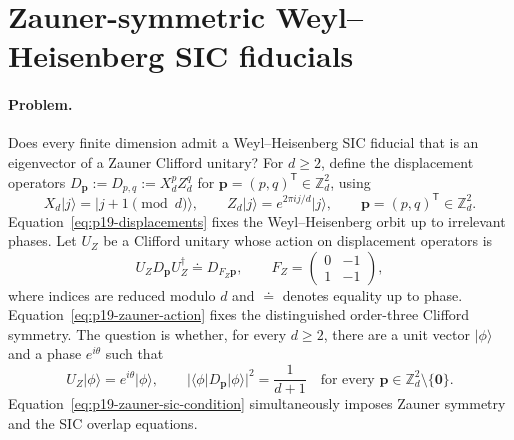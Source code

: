 \section{Zauner-symmetric Weyl--Heisenberg SIC fiducials}
\label{sec:op_ff2e80b425aebb86}

\paragraph{Problem.}
Does every finite dimension admit a Weyl--Heisenberg SIC fiducial that is an
eigenvector of a Zauner Clifford unitary?  For $d\geq2$, define the displacement
operators $D_{\mathbf p}:=D_{p,q}:=X_d^pZ_d^q$ for
$\mathbf p=(p,q)^{\mathsf T}\in\mathbb Z_d^2$, using
\begin{equation}
  X_d\lvert j\rangle=\lvert j+1\!\!\pmod d\rangle,
  \qquad
  Z_d\lvert j\rangle=e^{2\pi i j/d}\lvert j\rangle,
  \qquad \mathbf p=(p,q)^{\mathsf T}\in\mathbb Z_d^2.
  \label{eq:p19-displacements}
\end{equation}
Equation~\eqref{eq:p19-displacements} fixes the Weyl--Heisenberg orbit up to
irrelevant phases.  Let $U_Z$ be a Clifford unitary whose action on displacement
operators is
\begin{equation}
  U_ZD_{\mathbf p}U_Z^\dagger\doteq D_{F_Z\mathbf p},
  \qquad
  F_Z=
  \begin{pmatrix}
    0&-1\\
    1&-1
  \end{pmatrix},
  \label{eq:p19-zauner-action}
\end{equation}
where indices are reduced modulo $d$ and $\doteq$ denotes equality up to phase.
Equation~\eqref{eq:p19-zauner-action} fixes the distinguished order-three
Clifford symmetry.
The question is whether, for every $d\geq2$, there are a unit vector
$\lvert\phi\rangle$ and a phase $e^{i\theta}$ such that
\begin{equation}
  U_Z\lvert\phi\rangle=e^{i\theta}\lvert\phi\rangle,
  \qquad
  \bigl|\langle\phi\rvert D_{\mathbf p}\lvert\phi\rangle\bigr|^2
  =\frac{1}{d+1}
  \quad\text{for every }\mathbf p\in\mathbb Z_d^2\setminus\{\mathbf0\}.
  \label{eq:p19-zauner-sic-condition}
\end{equation}
Equation~\eqref{eq:p19-zauner-sic-condition} simultaneously imposes Zauner
symmetry and the SIC overlap equations.

